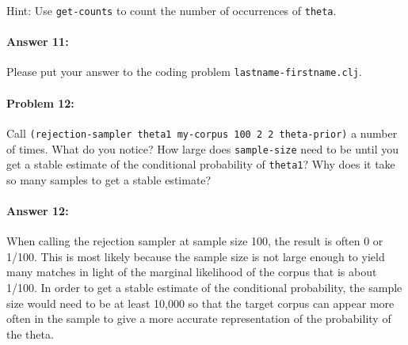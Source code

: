 \documentclass[10pt]{article}
\begin{document}
\noindent Hint: Use \texttt{get-counts} to count the number of
occurrences of \texttt{theta}.

\paragraph{Answer 11:} Please put your answer to the coding problem
\texttt{lastname-firstname.clj}.

\paragraph{Problem 12:}

Call \texttt{(rejection-sampler theta1 my-corpus 100 2 2 theta-prior)}
a number of times. What do you notice? How large does
\texttt{sample-size} need to be until you get a stable estimate of the
conditional probability of \texttt{theta1}? Why does it take so many
samples to get a stable estimate?

\paragraph{Answer 12:} When calling the rejection sampler at sample size 100, the result is often 0 or 1/100. This is most likely because the sample size is not large enough to yield many matches in light of the marginal likelihood of the corpus that is about 1/100. In order to get a stable estimate of the conditional probability, the sample size would need to be at least 10,000 so that the target corpus can appear more often in the sample to give a more accurate representation of the probability of the theta.
\end{document}
